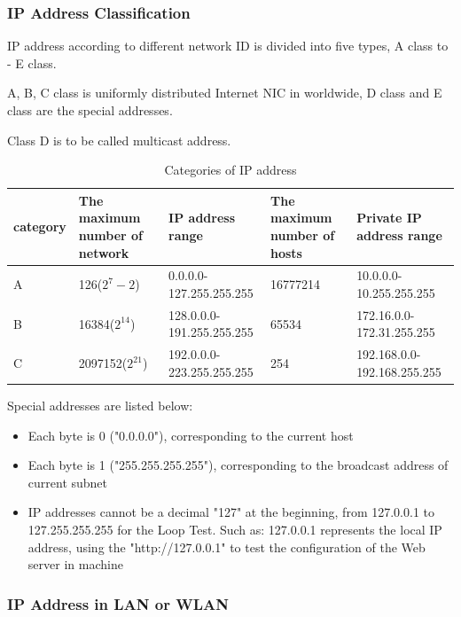\subsubsection{IP Address Classification}

IP address according to different network ID is divided into five types, A class to - E class.  

A, B, C class is uniformly distributed Internet NIC in worldwide, D class and E class are the special addresses.  

Class D is to be called multicast address.

\begin{table}[h]
\begin{longtable}{| p{4em} | p{6em} | p{6em} | p{7em} | p{9em} |}
\hline
\textbf{category} & \textbf{The maximum number of network} & \textbf{IP address range} & \textbf{The maximum number of hosts} & \textbf{Private IP address range} \\ \hline
A & 126($ 2^7-2 $) & 0.0.0.0-127.255.255.255 & 16777214 & 10.0.0.0-10.255.255.255 \\ \hline
B & 16384($ 2^{14} $) & 128.0.0.0-191.255.255.255 & 65534 & 172.16.0.0-172.31.255.255 \\ \hline
C & 2097152($ 2^{21} $) & 192.0.0.0-223.255.255.255 & 254 & 192.168.0.0-192.168.255.255 \\ \hline 
\end{longtable}
\caption{Categories of IP address}
\end{table}



Special addresses are listed below:

\begin{itemize}
	\item Each byte is 0 ("0.0.0.0"), corresponding to the current host
	\item Each byte is 1 ("255.255.255.255"), corresponding to the broadcast address of current subnet
	\item IP addresses cannot be a decimal "127" at the beginning, from 127.0.0.1 to 127.255.255.255 for the Loop Test. Such as: 127.0.0.1 represents the local IP address, using the "http://127.0.0.1" to test the configuration of the Web server in machine
\end{itemize}

\subsubsection{IP Address in LAN or WLAN}

